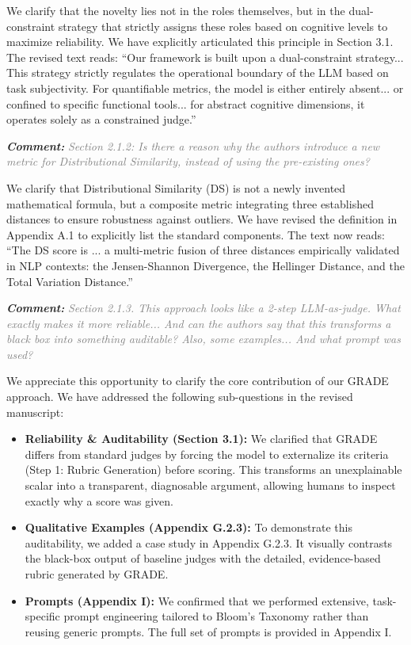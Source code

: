 \documentclass[11pt, a4paper]{article}
\newcommand{\comment}[1]{%
    \par\vspace{1em}%
    \noindent\textbf{\textit{Comment:}} \textit{\textcolor{gray}{#1}}%
}
\begin{document}
We clarify that the novelty lies not in the roles themselves, but in the dual-constraint strategy that strictly assigns these roles based on cognitive levels to maximize reliability. We have explicitly articulated this principle in Section 3.1. The revised text reads: ``Our framework is built upon a dual-constraint strategy... This strategy strictly regulates the operational boundary of the LLM based on task subjectivity. For quantifiable metrics, the model is either entirely absent... or confined to specific functional tools... for abstract cognitive dimensions, it operates solely as a constrained judge.''

\comment{Section 2.1.2: Is there a reason why the authors introduce a new metric for Distributional Similarity, instead of using the pre-existing ones?}

We clarify that Distributional Similarity (DS) is not a newly invented mathematical formula, but a composite metric integrating three established distances to ensure robustness against outliers. We have revised the definition in Appendix A.1 to explicitly list the standard components. The text now reads: ``The DS score is ... a multi-metric fusion of three distances empirically validated in NLP contexts: the Jensen-Shannon Divergence, the Hellinger Distance, and the Total Variation Distance.''


\comment{Section 2.1.3. This approach looks like a 2-step LLM-as-judge. What exactly makes it more reliable... And can the authors say that this transforms a black box into something auditable? Also, some examples... And what prompt was used?}

We appreciate this opportunity to clarify the core contribution of our GRADE approach. We have addressed the following sub-questions in the revised manuscript:

\begin{itemize}
    \item \textbf{Reliability \& Auditability (Section 3.1):} We clarified that GRADE differs from standard judges by forcing the model to externalize its criteria (Step 1: Rubric Generation) before scoring. This transforms an unexplainable scalar into a transparent, diagnosable argument, allowing humans to inspect exactly why a score was given.
    \item \textbf{Qualitative Examples (Appendix G.2.3):} To demonstrate this auditability, we added a case study in Appendix G.2.3. It visually contrasts the black-box output of baseline judges with the detailed, evidence-based rubric generated by GRADE.
    \item \textbf{Prompts (Appendix I):} We confirmed that we performed extensive, task-specific prompt engineering tailored to Bloom's Taxonomy rather than reusing generic prompts. The full set of prompts is provided in Appendix I.
\end{itemize}
\end{document}
